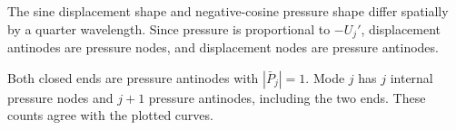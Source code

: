 The sine displacement shape and negative-cosine pressure shape differ spatially by a quarter wavelength. Since pressure is proportional to $-U_j'$, displacement antinodes are pressure nodes, and displacement nodes are pressure antinodes.

Both closed ends are pressure antinodes with $|\bar{P}_j|=1$. Mode $j$ has $j$ internal pressure nodes and $j+1$ pressure antinodes, including the two ends. These counts agree with the plotted curves.

\clearpage
{}


